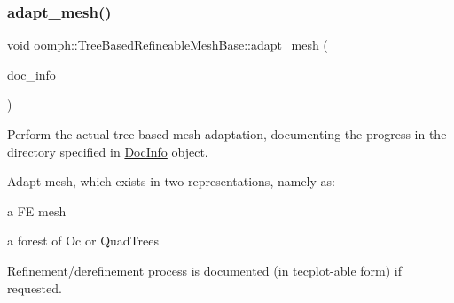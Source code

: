 \subsubsection{\texorpdfstring{adapt\+\_\+mesh()}{adapt\_mesh()}\hspace{0.1cm}{\footnotesize\ttfamily [1/2]}}
{\footnotesize\ttfamily void oomph\+::\+Tree\+Based\+Refineable\+Mesh\+Base\+::adapt\+\_\+mesh (\begin{DoxyParamCaption}\item[{\hyperlink{classoomph_1_1DocInfo}{Doc\+Info} \&}]{doc\+\_\+info }\end{DoxyParamCaption})\hspace{0.3cm}{\ttfamily [virtual]}}



Perform the actual tree-\/based mesh adaptation, documenting the progress in the directory specified in \hyperlink{classoomph_1_1DocInfo}{Doc\+Info} object. 

Adapt mesh, which exists in two representations, namely as\+:
\begin{DoxyItemize}
\item a FE mesh
\item a forest of Oc or Quad\+Trees
\end{DoxyItemize}

Refinement/derefinement process is documented (in tecplot-\/able form) if requested.

